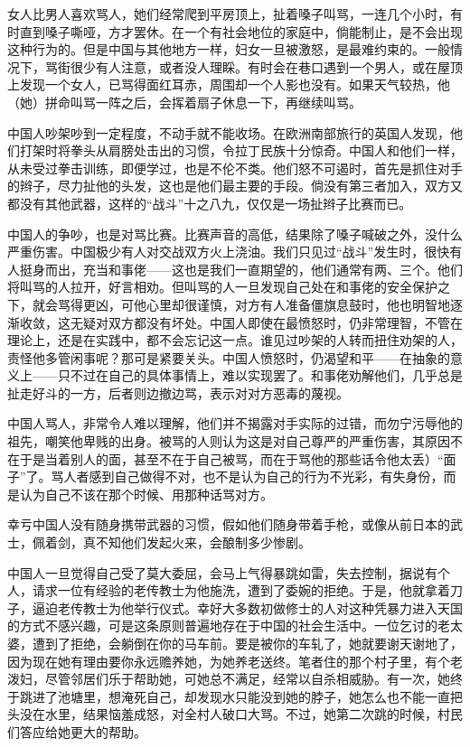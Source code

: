 \documentclass[12pt,oneside]{book}
\begin{document}
\begin{common-format}
女人比男人喜欢骂人，她们经常爬到平房顶上，扯着嗓子叫骂，一连几个小时，有时直到嗓子嘶哑，方才罢休。在一个有社会地位的家庭中，倘能制止，是不会出现这种行为的。但是中国与其他地方一样，妇女一旦被激怒，是最难约束的。一般情况下，骂街很少有人注意，或者没人理睬。有时会在巷口遇到一个男人，或在屋顶上发现一个女人，已骂得面红耳赤，周围却一个人影也没有。如果天气较热，他（她）拼命叫骂一阵之后，会挥着扇子休息一下，再继续叫骂。 

中国人吵架吵到一定程度，不动手就不能收场。在欧洲南部旅行的英国人发现，他们打架时将拳头从肩膀处击出的习惯，令拉丁民族十分惊奇。中国人和他们一样，从未受过拳击训练，即便学过，也是不伦不类。他们怒不可遏时，首先是抓住对手的辫子，尽力扯他的头发，这也是他们最主要的手段。倘没有第三者加入，双方又都没有其他武器，这样的“战斗”十之八九，仅仅是一场扯辫子比赛而已。 

中国人的争吵，也是对骂比赛。比赛声音的高低，结果除了嗓子喊破之外，没什么严重伤害。中国极少有人对交战双方火上浇油。我们只见过“战斗”发生时，很快有人挺身而出，充当和事佬——这也是我们一直期望的，他们通常有两、三个。他们将叫骂的人拉开，好言相劝。但叫骂的人一旦发现自己处在和事佬的安全保护之下，就会骂得更凶，可他心里却很谨慎，对方有人准备僵旗息鼓时，他也明智地逐渐收敛，这无疑对双方都没有坏处。中国人即使在最愤怒时，仍非常理智，不管在理论上，还是在实践中，都不会忘记这一点。谁见过吵架的人转而扭住劝架的人，责怪他多管闲事呢？那可是紧要关头。中国人愤怒时，仍渴望和平——在抽象的意义上——只不过在自己的具体事情上，难以实现罢了。和事佬劝解他们，几乎总是扯走好斗的一方，后者则边撤边骂，表示对对方恶毒的蔑视。 

中国人骂人，非常令人难以理解，他们并不揭露对手实际的过错，而勿宁污辱他的祖先，嘲笑他卑贱的出身。被骂的人则认为这是对自己尊严的严重伤害，其原因不在于是当着别人的面，甚至不在于自己被骂，而在于骂他的那些话令他太丢）“面子”了。骂人者感到自己做得不对，也不是认为自己的行为不光彩，有失身份，而是认为自己不该在那个时候、用那种话骂对方。 

幸亏中国人没有随身携带武器的习惯，假如他们随身带着手枪，或像从前日本的武士，佩着剑，真不知他们发起火来，会酿制多少惨剧。 

中国人一旦觉得自己受了莫大委屈，会马上气得暴跳如雷，失去控制，据说有个人，请求一位有经验的老传教士为他施洗，遭到了委婉的拒绝。于是，他就拿着刀子，逼迫老传教士为他举行仪式。幸好大多数初做修士的人对这种凭暴力进入天国的方式不感兴趣，可是这条原则普遍地存在于中国的社会生活中。一位乞讨的老太婆，遭到了拒绝，会躺倒在你的马车前。要是被你的车轧了，她就要谢天谢地了，因为现在她有理由要你永远赡养她，为她养老送终。笔者住的那个村子里，有个老泼妇，尽管邻居们乐于帮助她，可她总不满足，经常以自杀相威胁。有一次，她终于跳进了池塘里，想淹死自己，却发现水只能没到她的脖子，她怎么也不能一直把头没在水里，结果恼羞成怒，对全村人破口大骂。不过，她第二次跳的时候，村民们答应给她更大的帮助。 


\end{common-format}
\end{document}
